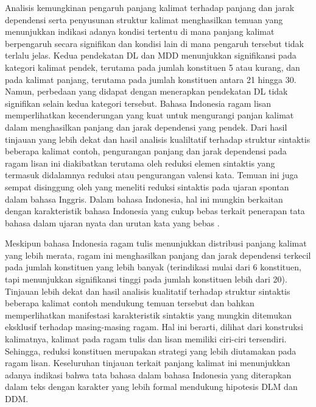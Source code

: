 Analisis kemungkinan pengaruh panjang kalimat terhadap panjang dan jarak dependensi serta penyusunan struktur kalimat menghasilkan temuan yang menunjukkan indikasi adanya kondisi tertentu di mana panjang kalimat berpengaruh secara signifikan dan kondisi lain di mana pengaruh tersebut tidak terlalu jelas. Kedua pendekatan DL dan MDD menunjukkan signifikansi pada kategori kalimat pendek, terutama pada jumlah konstituen 5 atau kurang, dan pada kalimat panjang, terutama pada jumlah konstituen antara 21 hingga 30. Namun, perbedaan yang didapat dengan menerapkan pendekatan DL tidak signifikan selain kedua kategori tersebut. Bahasa Indonesia ragam lisan memperlihatkan kecenderungan yang kuat untuk mengurangi panjan kalimat dalam menghasilkan panjang dan jarak dependensi yang pendek. Dari hasil tinjauan yang lebih dekat dan hasil analisis kualiltatif terhadap struktur sintaktis beberapa kalimat contoh, pengurangan panjang dan jarak dependensi pada ragam lisan ini diakibatkan terutama oleh reduksi elemen sintaktis yang termasuk didalamnya reduksi atau pengurangan valensi kata. Temuan ini juga sempat disinggung oleh \cite{jaeger2006redundancy} yang meneliti reduksi sintaktis  pada ujaran spontan dalam bahasa Inggris. Dalam bahasa Indonesia, hal ini mungkin berkaitan dengan karakteristik bahasa Indonesia yang cukup bebas terkait penerapan tata bahasa dalam ujaran nyata \citep{sneddon2010indonesian} dan urutan kata yang bebas \citealp{sneddon2010indonesian, kridalaksana2002struktur}. 

Meskipun bahasa Indonesia ragam tulis menunjukkan distribusi panjang kalimat yang lebih merata, ragam ini menghasilkan panjang dan jarak dependensi terkecil pada jumlah konstituen yang lebih banyak (terindikasi mulai dari 6 konstituen, tapi menunjukkan signifikansi tinggi pada jumlah konstituen lebih dari 20). Tinjauan lebih dekat dan hasil analisis kualitatif terhadap struktur sintaktis beberapa kalimat contoh mendukung temuan tersebut dan bahkan memperlihatkan manifestasi karakteristik sintaktis yang mungkin ditemukan eksklusif terhadap masing-masing ragam. Hal ini berarti, dilihat dari konstruksi kalimatnya, kalimat pada ragam tulis dan lisan memiliki ciri-ciri tersendiri. Sehingga, reduksi konstituen merupakan strategi yang lebih diutamakan pada ragam lisan. Keseluruhan tinjauan terkait panjang kalimat ini menunjukkan adanya indikasi bahwa tata bahasa dalam bahasa Indonesia yang diterapkan dalam teks dengan karakter yang lebih formal mendukung hipotesis DLM dan DDM. 

